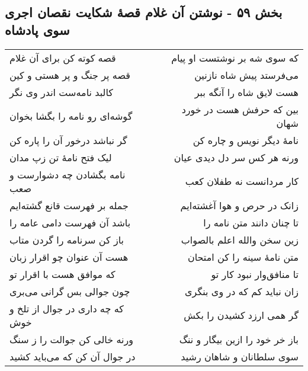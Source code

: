 \begin{center}
\section*{بخش ۵۹ - نوشتن آن غلام قصهٔ شکایت نقصان اجری سوی پادشاه}
\label{sec:sh059}
\begin{longtable}{l p{0.5cm} r}
قصه کوته کن برای آن غلام
&&
که سوی شه بر نوشتست او پیام
\\
قصه پر جنگ و پر هستی و کین
&&
می‌فرستد پیش شاه نازنین
\\
کالبد نامه‌ست اندر وی نگر
&&
هست لایق شاه را آنگه ببر
\\
گوشه‌ای رو نامه را بگشا بخوان
&&
بین که حرفش هست در خورد شهان
\\
گر نباشد درخور آن را پاره کن
&&
نامهٔ دیگر نویس و چاره کن
\\
لیک فتح نامهٔ تن زپ مدان
&&
ورنه هر کس سر دل دیدی عیان
\\
نامه بگشادن چه دشوارست و صعب
&&
کار مردانست نه طفلان کعب
\\
جمله بر فهرست قانع گشته‌ایم
&&
زانک در حرص و هوا آغشته‌ایم
\\
باشد آن فهرست دامی عامه را
&&
تا چنان دانند متن نامه را
\\
باز کن سرنامه را گردن متاب
&&
زین سخن والله اعلم بالصواب
\\
هست آن عنوان چو اقرار زبان
&&
متن نامهٔ سینه را کن امتحان
\\
که موافق هست با اقرار تو
&&
تا منافق‌وار نبود کار تو
\\
چون جوالی بس گرانی می‌بری
&&
زان نباید کم که در وی بنگری
\\
که چه داری در جوال از تلخ و خوش
&&
گر همی ارزد کشیدن را بکش
\\
ورنه خالی کن جوالت را ز سنگ
&&
باز خر خود را ازین بیگار و ننگ
\\
در جوال آن کن که می‌باید کشید
&&
سوی سلطانان و شاهان رشید
\\
\end{longtable}
\end{center}
